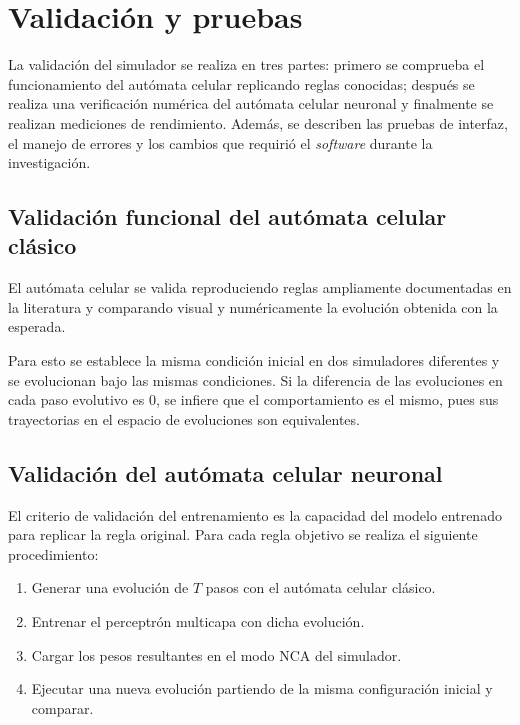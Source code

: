 \section{Validación y pruebas}

La validación del simulador se realiza en tres partes: primero se comprueba el funcionamiento del autómata celular replicando reglas conocidas; después se realiza una verificación numérica del autómata celular neuronal y finalmente se realizan mediciones de rendimiento. Además, se describen las pruebas de interfaz, el manejo de errores y los cambios que requirió el \textit{software} durante la investigación.

\subsection{Validación funcional del autómata celular clásico}

El autómata celular se valida reproduciendo reglas ampliamente documentadas en la literatura y comparando visual y numéricamente la evolución obtenida con la esperada.

Para esto se establece la misma condición inicial en dos simuladores diferentes y se evolucionan bajo las mismas condiciones. Si la diferencia de las evoluciones en cada paso evolutivo es $0$, se infiere que el comportamiento es el mismo, pues sus trayectorias en el espacio de evoluciones son equivalentes.

\subsection{Validación del autómata celular neuronal}

El criterio de validación del entrenamiento es la capacidad del modelo entrenado para replicar la regla original. Para cada regla objetivo se realiza el siguiente procedimiento:

\begin{enumerate}
    \item Generar una evolución de $T$ pasos con el autómata celular clásico.
    \item Entrenar el perceptrón multicapa con dicha evolución.
    \item Cargar los pesos resultantes en el modo NCA del simulador.
    \item Ejecutar una nueva evolución partiendo de la misma configuración inicial y comparar.
\end{enumerate}

